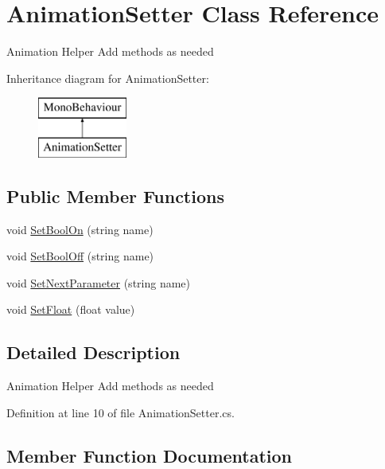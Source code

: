 \hypertarget{class_animation_setter}{}\section{Animation\+Setter Class Reference}
\label{class_animation_setter}


Animation Helper Add methods as needed  


Inheritance diagram for Animation\+Setter\+:\begin{figure}[H]
\begin{center}
\leavevmode
\includegraphics[height=2.000000cm]{class_animation_setter}
\end{center}
\end{figure}
\subsection*{Public Member Functions}
\begin{DoxyCompactItemize}
\item 
void \mbox{\hyperlink{class_animation_setter_afbd08ba6b38787063ff772eff7b18b8d}{Set\+Bool\+On}} (string name)
\item 
void \mbox{\hyperlink{class_animation_setter_a7646561dc385b3a3850adf6a3258f41f}{Set\+Bool\+Off}} (string name)
\item 
void \mbox{\hyperlink{class_animation_setter_af21491dbc13ae2314bcc45b58c45c4e2}{Set\+Next\+Parameter}} (string name)
\item 
void \mbox{\hyperlink{class_animation_setter_abd92ef0385ccaf71233fec4ea3e2c61e}{Set\+Float}} (float value)
\end{DoxyCompactItemize}


\subsection{Detailed Description}
Animation Helper Add methods as needed 



Definition at line 10 of file Animation\+Setter.\+cs.



\subsection{Member Function Documentation}
\mbox{\label{class_animation_setter_a7646561dc385b3a3850adf6a3258f41f}} 
